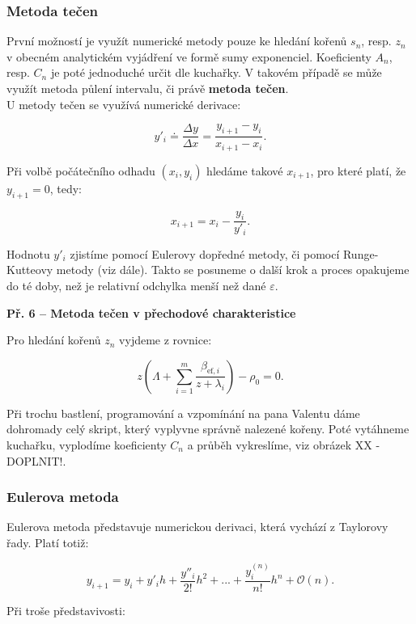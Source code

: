 \subsubsection{Metoda tečen}

První možností je využít numerické metody pouze ke hledání kořenů $s_n$, resp. $z_n$ v obecném analytickém vyjádření ve formě sumy exponenciel. Koeficienty $A_n$, resp. $C_n$ je poté jednoduché určit dle kuchařky. V takovém případě se může využít metoda půlení intervalu, či právě \textbf{metoda tečen}.\\

U metody tečen se využívá numerické derivace:

$$ y'_i \doteq \dfrac{\Delta y}{\Delta x} = \dfrac{y_{i+1}-y_i}{x_{i+1}-x_i}. $$

Při volbě počátečního odhadu $(x_i, y_i)$ hledáme takové $x_{i+1}$, pro které platí, že $y_{i+1} = 0$, tedy:

$$ x_{i+1} = x_i - \dfrac{y_i}{y'_i}. $$

Hodnotu $y'_i$ zjistíme pomocí Eulerovy dopředné metody, či pomocí Runge-Kutteovy metody (viz dále). Takto se posuneme o další krok a proces opakujeme do té doby, než je relativní odchylka menší než dané $\varepsilon$.\\

\small

\textbf{Př. 6 -- Metoda tečen v přechodové charakteristice}

Pro hledání kořenů $z_n$ vyjdeme z rovnice:

$$ z \left ( \Lambda + \sum_{i = 1}^m \dfrac{\beta_{\text{ef},i}}{z + \lambda_i} \right ) - \rho_0 = 0. $$

Při trochu bastlení, programování a vzpomínání na pana Valentu dáme dohromady celý skript, který vyplyvne správně nalezené kořeny. Poté vytáhneme kuchařku, vyplodíme koeficienty $C_n$ a průběh vykreslíme, viz obrázek XX - DOPLNIT!.

\normalsize

\subsubsection{Eulerova metoda}

Eulerova metoda představuje numerickou derivaci, která vychází z Taylorovy řady. Platí totiž:

$$ y_{i+1} = y_i + y'_i h + \dfrac{y''_i}{2!} h^2 + ... + \dfrac{y^{(n)}_i}{n!} h^n + \mathcal{O}(n). $$

Při troše představivosti:

